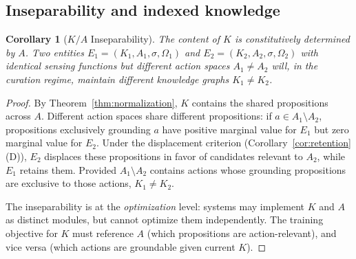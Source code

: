 \documentclass[11pt]{article}
\newtheorem{corollary}[theorem]{Corollary}
\theoremstyle{definition}
\theoremstyle{remark}
\begin{document}
\subsection{Inseparability and indexed knowledge}

\begin{corollary}[$K/A$ Inseparability]
\label{cor:inseparability}
The content of $K$ is constitutively determined by $A$. Two entities
$E_1 = (K_1, A_1, \sigma, \Omega_1)$ and $E_2 = (K_2, A_2, \sigma,
\Omega_2)$ with identical sensing functions but different action spaces
$A_1 \neq A_2$ will, in the curation regime, maintain different knowledge
graphs $K_1 \neq K_2$.
\end{corollary}

\begin{proof}
By Theorem~\ref{thm:normalization}, $K$ contains the shared propositions
across $A$. Different action spaces share different propositions:
if $a \in A_1 \setminus A_2$, propositions exclusively grounding $a$
have positive marginal value for $E_1$ but zero marginal value for
$E_2$. Under the displacement criterion
(Corollary~\ref{cor:retention}(D)), $E_2$ displaces these propositions
in favor of candidates relevant to $A_2$, while $E_1$ retains them.
Provided $A_1 \setminus A_2$ contains actions whose grounding
propositions are exclusive to those actions, $K_1 \neq K_2$.

The inseparability is at the \emph{optimization} level: systems may
implement $K$ and $A$ as distinct modules, but cannot optimize them
independently. The training objective for $K$ must reference $A$
(which propositions are action-relevant), and vice versa (which actions
are groundable given current $K$).
\end{proof}
\end{document}
